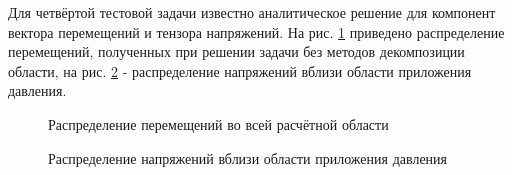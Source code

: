 \documentclass[a4paper]{article}
\begin{document}
\newpage

Для четвёртой тестовой задачи известно аналитическое решение для компонент вектора перемещений и тензора напряжений. На рис. \ref{fig:task_04_basic_displacement_distribution} приведено распределение перемещений, полученных при решении задачи без методов декомпозиции области, на рис. \ref{fig:task_04_basic_pressure_distribution} - распределение напряжений вблизи области приложения давления.

\begin{figure}[h]
\caption{Распределение перемещений во всей расчётной области}
\label{fig:task_04_basic_displacement_distribution}
\end{figure}

\begin{figure}[h]
\caption{Распределение напряжений вблизи области приложения давления}
\label{fig:task_04_basic_pressure_distribution}
\end{figure}
\end{document}
